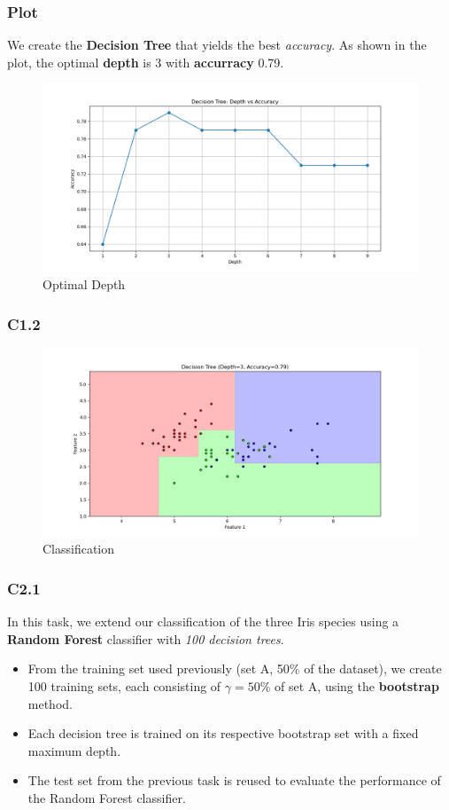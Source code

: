 \documentclass{beamer}
\begin{document}
\begin{frame}
\frametitle{Plot}
We create the \textbf{Decision Tree} that yields the best \textit{accuracy}. As shown in the plot, the optimal \textbf{depth} is 3 with \textbf{accurracy} 0.79.
\begin{figure}
    \centering
    \includegraphics[width=1\linewidth]{assets/C1.1.png}
    \caption{Optimal Depth}
    \label{fig:enter-label}
\end{figure}
\end{frame}

\begin{frame}
\frametitle{C1.2}
\begin{figure}
    \centering
    \includegraphics[width=1\linewidth]{assets/C1.2.png}
    \caption{Classification}
    \label{fig:enter-label}
\end{figure}
\end{frame}

\begin{frame}
\frametitle{C2.1}
In this task, we extend our classification of the three Iris species using a \textbf{Random Forest} classifier with \textit{100 decision trees}. 
\begin{itemize}
    \item From the training set used previously (set A, 50\% of the dataset), we create 100 training sets, each consisting of $\gamma = 50\%$ of set A, using the \textbf{bootstrap} method.
    \item Each decision tree is trained on its respective bootstrap set with a fixed maximum depth.
    \item The test set from the previous task is reused to evaluate the performance of the Random Forest classifier.
\end{itemize}
\end{frame}
\end{document}
